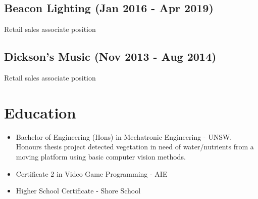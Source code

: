 \documentclass[12pt]{article}
\begin{document}
\begin{FlushLeft}
  \subsection{Beacon Lighting (Jan 2016 - Apr 2019)}
  Retail sales associate position

  \subsection{Dickson's Music (Nov 2013 - Aug 2014)}
  Retail sales associate position

  \section{Education}
  \begin{itemize}
  \item Bachelor of Engineering (Hons) in Mechatronic Engineering - UNSW. Honours thesis project detected vegetation in need of water/nutrients from a moving platform using basic computer vision methods.
  \item Certificate 2 in Video Game Programming - AIE
  \item Higher School Certificate - Shore School
  \end{itemize}

\end{FlushLeft}
\end{document}
